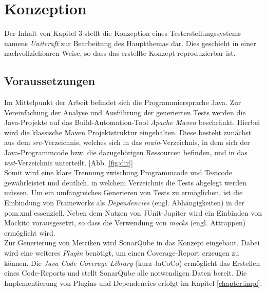 \chapter{Konzeption}
Der Inhalt von Kapitel 3 stellt die Konzeption eines Testerstellungssystems namens \textit{Unitcraft} zur Bearbeitung des Hauptthemas dar. Dies geschieht in einer nachvollziehbaren Weise, so dass das erstellte Konzept reproduzierbar ist.

\section{Voraussetzungen}
Im Mittelpunkt der Arbeit befindet sich die Programmiersprache Java. Zur Vereinfachung der Analyse und Ausführung der generierten Tests werden die Java-Projekte auf das Build-Automation-Tool \textit{Apache Maven} beschränkt. Hierbei wird die klassische Maven Projektstruktur eingehalten. Diese besteht zunächst aus dem \textit{src}-Verzeichnis, welches sich in das \textit{main}-Verzeichnis, in dem sich der Java-Programmcode bzw. die dazugehörigen Ressourcen befinden, und in das \textit{test}-Verzeichnis unterteilt. \cite{MavenIntroductionStandard} [Abb. \ref{fig:dir}]\\ Somit wird eine klare Trennung zwischung Programmcode und Testcode gewährleistet und deutlich, in welchem Verzeichnis die Tests abgelegt werden müssen.  \newpage
Um ein umfangreiches Generieren von Tests zu ermöglichen, ist die Einbindung von Frameworks als \textit{Dependencies} (engl. Abhängigkeiten) in der pom.xml essenziell. Neben dem Nutzen von JUnit-Jupiter wird ein Einbinden von Mockito vorausgesetzt, so dass die Verwendung von \textit{mocks} (engl. Attrappen) ermöglicht wird.\\
Zur Generierung von Metriken wird SonarQube in das Konzept eingebaut. Dabei wird eine weiteres \textit{Plugin} benötigt, um einen Coverage-Report erzeugen zu können. Die \textit{Java Code Coverage Library} (kurz JaCoCo) ermöglicht das Erstellen eines Code-Reports und stellt SonarQube alle notwendigen Daten bereit.
Die Implementierung von Plugins und Dependencies erfolgt im Kapitel \ref{chapter:impl}.

